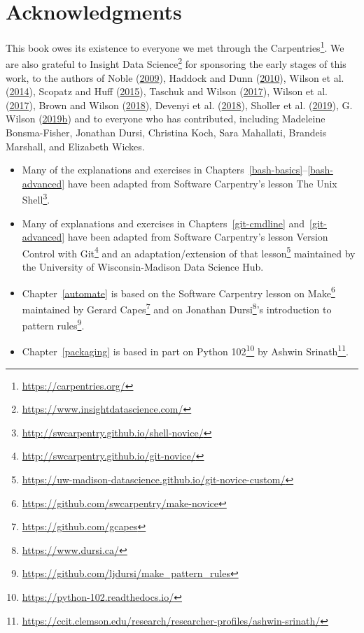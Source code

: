 \documentclass[
]{krantz}
\renewcommand{\href}[2]{#2\footnote{\url{#1}}}
\begin{document}
\hypertarget{intro-ack}{%
\section{Acknowledgments}\label{intro-ack}}

This book owes its existence to
everyone we met through \href{https://carpentries.org/}{the Carpentries}.
We are also grateful to \href{https://www.insightdatascience.com/}{Insight Data Science} for sponsoring the early stages of this work,
to the authors of Noble (\protect\hyperlink{ref-Nobl2009}{2009}), Haddock and Dunn (\protect\hyperlink{ref-Hadd2010}{2010}), Wilson et al. (\protect\hyperlink{ref-Wils2014}{2014}), Scopatz and Huff (\protect\hyperlink{ref-Scop2015}{2015}), Taschuk and Wilson (\protect\hyperlink{ref-Tasc2017}{2017}), Wilson et al. (\protect\hyperlink{ref-Wils2017}{2017}), Brown and Wilson (\protect\hyperlink{ref-Brow2018}{2018}), Devenyi et al. (\protect\hyperlink{ref-Deve2018}{2018}), Sholler et al. (\protect\hyperlink{ref-Shol2019}{2019}), G. Wilson (\protect\hyperlink{ref-Wils2019}{2019}\protect\hyperlink{ref-Wils2019}{b})
and to everyone who has contributed, including Madeleine Bonsma-Fisher,
Jonathan Dursi,
Christina Koch,
Sara Mahallati,
Brandeis Marshall,
and Elizabeth Wickes.

\begin{itemize}
\item
  Many of the explanations and exercises in Chapters~\ref{bash-basics}--\ref{bash-advanced}
  have been adapted from Software Carpentry's lesson
  \href{http://swcarpentry.github.io/shell-novice/}{The Unix Shell}.
\item
  Many of explanations and exercises in Chapters~\ref{git-cmdline} and~\ref{git-advanced}
  have been adapted from Software Carpentry's lesson
  \href{http://swcarpentry.github.io/git-novice/}{Version Control with Git} and an
  \href{https://uw-madison-datascience.github.io/git-novice-custom/}{adaptation/extension of that lesson} maintained by
  the University of Wisconsin-Madison Data Science Hub.
\item
  Chapter~\ref{automate} is based on the \href{https://github.com/swcarpentry/make-novice}{Software Carpentry lesson on Make}
  maintained by \href{https://github.com/gcapes}{Gerard Capes}
  and on \href{https://www.dursi.ca/}{Jonathan Dursi}'s
  \href{https://github.com/ljdursi/make_pattern_rules}{introduction to pattern rules}.
\item
  Chapter~\ref{packaging} is based in part on \href{https://python-102.readthedocs.io/}{Python 102}
  by \href{https://ccit.clemson.edu/research/researcher-profiles/ashwin-srinath/}{Ashwin Srinath}.
\end{itemize}
\end{document}
